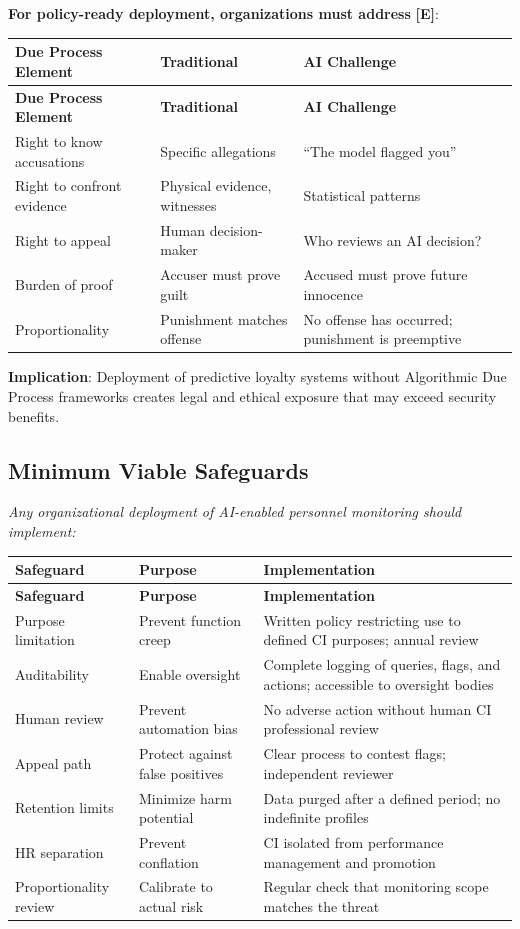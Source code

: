\documentclass[11pt,letterpaper]{article}
\begin{document}
\textbf{For policy-ready deployment, organizations must address} \textbf{[E]}:

{\small
\begin{longtable}{L{3.5cm}L{4cm}L{5cm}}
\toprule
\textbf{Due Process Element} & \textbf{Traditional} & \textbf{AI Challenge} \\
\midrule
\endfirsthead
\toprule
\textbf{Due Process Element} & \textbf{Traditional} & \textbf{AI Challenge} \\
\midrule
\endhead
Right to know accusations & Specific allegations & ``The model flagged you'' \\*
Right to confront evidence & Physical evidence, witnesses & Statistical patterns \\
Right to appeal & Human decision-maker & Who reviews an AI decision? \\*
Burden of proof & Accuser must prove guilt & Accused must prove future innocence \\
Proportionality & Punishment matches offense & No offense has occurred; punishment is preemptive \\
\bottomrule
\end{longtable}}

\textbf{Implication}: Deployment of predictive loyalty systems without Algorithmic Due Process frameworks creates legal and ethical exposure that may exceed security benefits.

\subsection{Minimum Viable Safeguards}

\textit{Any organizational deployment of AI-enabled personnel monitoring should implement:}

{\small
\begin{longtable}{L{3.5cm}L{4.5cm}L{4.5cm}}
\toprule
\textbf{Safeguard} & \textbf{Purpose} & \textbf{Implementation} \\
\midrule
\endfirsthead
\toprule
\textbf{Safeguard} & \textbf{Purpose} & \textbf{Implementation} \\
\midrule
\endhead
Purpose limitation & Prevent function creep & Written policy restricting use to defined CI purposes; annual review \\*
Auditability & Enable oversight & Complete logging of queries, flags, and actions; accessible to oversight bodies \\
Human review & Prevent automation bias & No adverse action without human CI professional review \\
Appeal path & Protect against false positives & Clear process to contest flags; independent reviewer \\
Retention limits & Minimize harm potential & Data purged after a defined period; no indefinite profiles \\
HR separation & Prevent conflation & CI isolated from performance management and promotion \\*
Proportionality review & Calibrate to actual risk & Regular check that monitoring scope matches the threat \\
\bottomrule
\end{longtable}}
\end{document}
